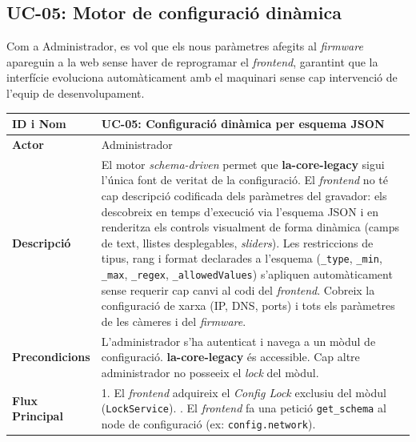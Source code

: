 \clearpage
\subsection{UC-05: Motor de configuració dinàmica}
Com a Administrador, es vol que els nous paràmetres afegits al \textit{firmware} apareguin a la web sense haver de reprogramar el \textit{frontend}, garantint que la interfície evoluciona automàticament amb el maquinari sense cap intervenció de l'equip de desenvolupament.

\begin{table}[htbp]
  \centering
  \small
  \begin{tabular}{|l|p{10cm}|}
    \hline
    \rowcolor{backcolour} \textbf{ID i Nom} & \textbf{UC-05: Configuració dinàmica per esquema JSON}                                                                         \\ \hline
    \textbf{Actor}                          & Administrador                                                                                                                  \\ \hline
    \textbf{Descripció}                     & El motor \textit{schema-driven} permet que \textbf{la-core-legacy} sigui l'única font de veritat de la configuració. El \textit{frontend} no té cap descripció codificada dels paràmetres del gravador: els descobreix en temps d'execució via l'esquema JSON i en renderitza els controls visualment de forma dinàmica (camps de text, llistes desplegables, \textit{sliders}). Les restriccions de tipus, rang i format declarades a l'esquema (\texttt{\_type}, \texttt{\_min}, \texttt{\_max}, \texttt{\_regex}, \texttt{\_allowedValues}) s'apliquen automàticament sense requerir cap canvi al codi del \textit{frontend}. Cobreix la configuració de xarxa (IP, DNS, ports) i tots els paràmetres de les càmeres i del \textit{firmware}.   \\ \hline
    \textbf{Precondicions}                  & L'administrador s'ha autenticat i navega a un mòdul de configuració. \textbf{la-core-legacy} és accessible. Cap altre administrador no posseeix el \textit{lock} del mòdul.      \\ \hline
    \textbf{Flux Principal}                 &
    1. El \textit{frontend} adquireix el \textit{Config Lock} exclusiu del mòdul (\texttt{LockService}). \newline
    2. El \textit{frontend} fa una petició \texttt{get\_schema} al node de configuració (ex: \texttt{config.network}). \newline

\end{tabular}
\end{table}
